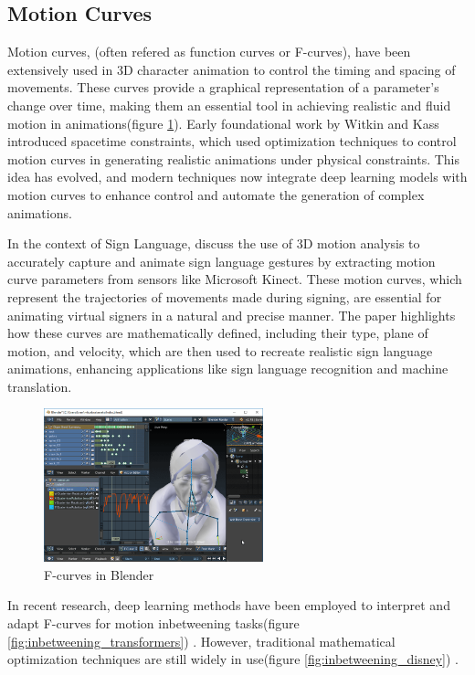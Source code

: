 \documentclass[../../main.tex]{subfiles}
\begin{document}
\subsection{Motion Curves}
\label{ch:intermediate_blocks:related_work:motion_curves}

Motion curves, (often refered as function curves or F-curves), have been extensively used in 3D character animation to control the timing and spacing of movements. These curves provide a graphical representation of a parameter's change over time, making them an essential tool in achieving realistic and fluid motion in animations(figure \ref{fig:fcurves_blender}). Early foundational work by Witkin and Kass \cite{witkin1988spacetime} introduced spacetime constraints, which used optimization techniques to control motion curves in generating realistic animations under physical constraints. This idea has evolved, and modern techniques now integrate deep learning models with motion curves to enhance control and automate the generation of complex animations.

In the context of Sign Language, \cite{inproceedings} discuss the use of 3D motion analysis to accurately capture and animate sign language gestures by extracting motion curve parameters from sensors like Microsoft Kinect. These motion curves, which represent the trajectories of movements made during signing, are essential for animating virtual signers in a natural and precise manner. The paper highlights how these curves are mathematically defined, including their type, plane of motion, and velocity, which are then used to recreate realistic sign language animations, enhancing applications like sign language recognition and machine translation.

\begin{figure}
    \centering \includegraphics[width = 2.5in]{chapters/intermediate_blocks/images/fcurves_blender.png}
    \caption{F-curves in Blender}
    \label{fig:fcurves_blender}
\end{figure}

In recent research, deep learning methods have been employed to interpret and adapt F-curves for motion inbetweening tasks(figure \ref{fig:inbetweening_transformers}) \cite{10.1145/3550454.3555454}. However, traditional mathematical optimization techniques are still widely in use(figure \ref{fig:inbetweening_disney}) \cite{10.1145/3306346.3322938}.
\end{document}
